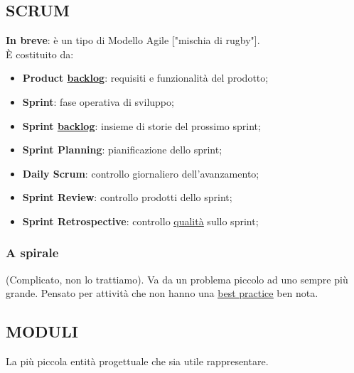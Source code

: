 			\subsection{SCRUM}		\label{scrum}
			\textbf{In breve}: è un tipo di Modello Agile ["mischia di rugby"]. \\
			È costituito da:
				\begin{itemize}
					\item \textbf{Product \underline{\hyperref[backlog]{backlog}}}: requisiti e funzionalità del prodotto;
					\item \textbf{Sprint}: fase operativa di sviluppo;
					\item \textbf{Sprint \underline{\hyperref[backlog]{backlog}}}: insieme di storie del prossimo sprint;
					\item \textbf{Sprint Planning}: pianificazione dello sprint;
					\item \textbf{Daily Scrum}: controllo giornaliero dell'avanzamento;
					\item \textbf{Sprint Review}: controllo prodotti dello sprint;
					\item \textbf{Sprint Retrospective}: controllo \underline{\hyperref[qualita]{qualità}} sullo sprint;
				\end{itemize}
			
			\subsubsection{A spirale} 
			(Complicato, non lo trattiamo). Va da un problema piccolo ad uno sempre più grande. Pensato per attività che non hanno una \underline{\hyperref[best]{best practice}} ben nota.
			
						
			
		\subsection{MODULI}		\label{moduli}
		La più piccola entità progettuale che sia utile rappresentare.	
	
	
